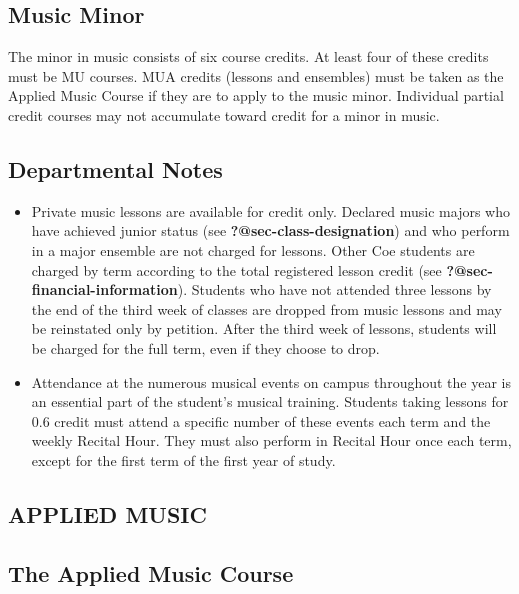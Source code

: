 \documentclass[
  letterpaper,
]{scrbook}
\providecommand{\tightlist}{%
  \setlength{\itemsep}{0pt}\setlength{\parskip}{0pt}}
\begin{document}
\hypertarget{music-minor}{%
\subsection{Music Minor}\label{music-minor}}

The minor in music consists of six course credits. At least four of
these credits must be MU courses. MUA credits (lessons and ensembles)
must be taken as the Applied Music Course if they are to apply to the
music minor. Individual partial credit courses may not accumulate toward
credit for a minor in music.

\hypertarget{departmental-notes}{%
\subsection{Departmental Notes}\label{departmental-notes}}

\begin{itemize}
\tightlist
\item
  Private music lessons are available for credit only. Declared music
  majors who have achieved junior status (see
  \textbf{?@sec-class-designation}) and who perform in a major ensemble
  are not charged for lessons. Other Coe students are charged by term
  according to the total registered lesson credit (see
  \textbf{?@sec-financial-information}). Students who have not attended
  three lessons by the end of the third week of classes are dropped from
  music lessons and may be reinstated only by petition. After the third
  week of lessons, students will be charged for the full term, even if
  they choose to drop.
\item
  Attendance at the numerous musical events on campus throughout the
  year is an essential part of the student's musical training. Students
  taking lessons for 0.6 credit must attend a specific number of these
  events each term and the weekly Recital Hour. They must also perform
  in Recital Hour once each term, except for the first term of the first
  year of study.
\end{itemize}

\hypertarget{applied-music}{%
\subsection{APPLIED MUSIC}\label{applied-music}}

\hypertarget{the-applied-music-course}{%
\subsection{The Applied Music Course}\label{the-applied-music-course}}
\end{document}
